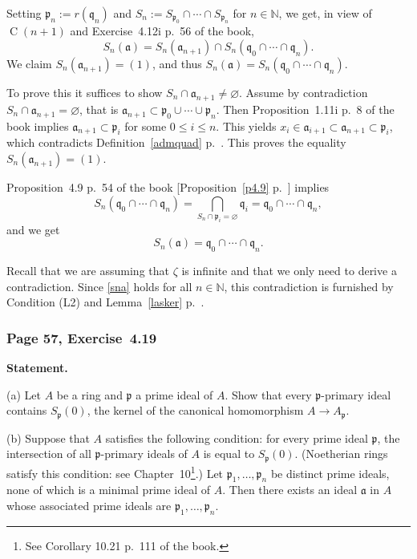\documentclass[12pt,letterpaper]{article}%
\newcommand{\oo}{\operatorname}\newcommand{\ooo}{\operatorname*}
\newcommand{\mf}{\mathfrak}
\newcommand{\aaa}{\mf a}
\newcommand{\ppp}{\mf p}
\newcommand{\qqq}{\mf q}
\newcommand{\nn}{\noindent}
\begin{document}
Setting $\ppp_n:=r(\qqq_n)$ and $S_n:=S_{\ppp_0}\cap\cdots\cap S_{\ppp_n}$ for $n\in\mathbb N$, we get, in view of $\oo C(n+1)$ and Exercise~4.12i p.~56 of the book, 
$$
S_n(\aaa)=S_n(\aaa_{n+1})\cap S_n(\qqq_0\cap\cdots\cap\qqq_n).
$$ 
We claim $S_n(\aaa_{n+1})=(1)$, and thus $S_n(\aaa)=S_n(\qqq_0\cap\cdots\cap\qqq_n)$.

To prove this it suffices to show $S_n\cap\aaa_{n+1}\ne\varnothing$. Assume by contradiction $S_n\cap\aaa_{n+1}=\varnothing$, that is $\aaa_{n+1}\subset\ppp_0\cup\cdots\cup\ppp_n$. Then Proposition~1.11i p.~8 of the book implies $\aaa_{n+1}\subset\ppp_i$ for some $0\le i\le n$. This yields $x_i\in\aaa_{i+1}\subset\aaa_{n+1}\subset\ppp_i$, which contradicts Definition~\ref{admquad} p.~\pageref{admquad}. This proves the equality $S_n(\aaa_{n+1})=(1)$.

Proposition~4.9 p.~54 of the book [Proposition~\ref{p4.9} p.~\pageref{p4.9}] implies 
$$
S_n(\qqq_0\cap\cdots\cap\qqq_n)=\bigcap_{S_n\cap\ppp_i=\varnothing}\qqq_i=\qqq_0\cap\cdots\cap\qqq_n,
$$ 
and we get 
\begin{equation}\label{sna}
S_n(\aaa)=\qqq_0\cap\cdots\cap\qqq_n.
\end{equation}

Recall that we are assuming that $\zeta$ is infinite and that we only need to derive a contradiction. Since \eqref{sna} holds for all $n\in\mathbb N$, this contradiction is furnished by Condition (L2) and Lemma~\ref{lasker} p.~\pageref{lasker}.

\subsubsection{Page 57, Exercise~4.19}%

\textbf{Statement.}

\nn(a) Let $A$ be a ring and $\mathfrak p$ a prime ideal of $A$. Show that every $\mathfrak p$-primary ideal contains $S_{\mathfrak p}(0)$, the kernel of the canonical homomorphism $A\to A_{\mathfrak p}$.

\nn(b) Suppose that $A$ satisfies the following condition: for every prime ideal $\mathfrak p$, the intersection of all $\mathfrak p$-primary ideals of $A$ is equal to $S_{\mathfrak p}(0)$. (Noetherian rings satisfy this condition: see Chapter~10\footnote{See Corollary 10.21 p.~111 of the book.}.) Let $\mathfrak p_1,\dots,\mathfrak p_n$ be distinct prime ideals, none of which is a minimal prime ideal of $A$. Then there exists an ideal $\mathfrak a$ in $A$ whose associated prime ideals are $\mathfrak p_1,\dots,\mathfrak p_n$.
\end{document}
